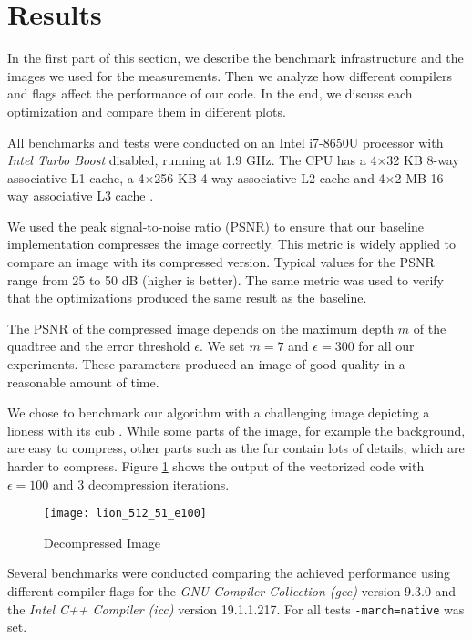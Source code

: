 \section{Results}\label{sec:exp}

In the first part of this section, we describe the benchmark infrastructure and the
images we used for the measurements. Then we analyze how different compilers and flags
affect the performance of our code. In the end, we discuss each optimization and compare
them in different plots.

 All benchmarks and tests were conducted on an Intel
i7-8650U processor with \textit{Intel Turbo Boost} disabled, running at 1.9
GHz. The CPU has a 4$\times$32 KB 8-way associative L1 cache, a 4$\times$256 KB
4-way associative L2 cache and 4$\times$2 MB 16-way associative L3 cache
\cite{intel-opt-manual}.

We used the peak signal-to-noise ratio (PSNR) to ensure that our baseline implementation
compresses the image correctly. This metric is widely applied to compare an image with its
compressed version. Typical values for the PSNR range from 25 to
50 dB (higher is better). The same metric was used to verify that the optimizations
produced the same result as the baseline.

The PSNR of the compressed image depends on the maximum depth $m$ of the quadtree and the error
threshold $\epsilon$. We set $m=7$ and $\epsilon=300$ for all our experiments. These parameters 
produced an image of good quality in a reasonable amount of time.

We chose to benchmark our algorithm with a challenging image depicting a lioness
with its cub \cite{lions}.
While some parts of the image, for example the
background, are easy to compress, other parts such as the fur contain lots of details,
which are harder to compress. Figure \ref{fig:lions} shows the output of the
vectorized code with $\epsilon=100$ and 3 decompression iterations.

\begin{figure}[H]
  \centering
  \texttt{[image: lion\_512\_51\_e100]}
  \caption{Decompressed Image}
  \label{fig:lions}
\end{figure}

 Several benchmarks were conducted comparing the achieved
performance using different compiler flags for the \textit{GNU Compiler
  Collection (gcc)} version 9.3.0 and the \textit{Intel C++ Compiler (icc)}
version 19.1.1.217. For all tests \texttt{-march=native} was set.

